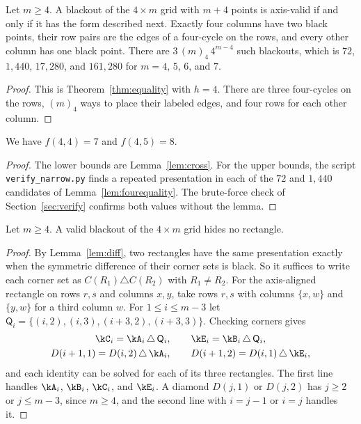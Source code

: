 \begin{lemma}\label{lem:fourequality}
Let $m\ge4$. A blackout of the $4\times m$ grid with $m+4$ points is axis-valid if and only if it has the form described next. Exactly four columns have two black points, their row pairs are the edges of a four-cycle on the rows, and every other column has one black point. There are $3\,(m)_4\,4^{m-4}$ such blackouts, which is $72$, $1{,}440$, $17{,}280$, and $161{,}280$ for $m=4$, $5$, $6$, and $7$.
\end{lemma}

\begin{proof}
This is Theorem~\ref{thm:equality} with $h=4$. There are three four-cycles on the rows, $(m)_4$ ways to place their labeled edges, and four rows for each other column.
\end{proof}

\begin{corollary}\label{cor:fourboundary}
We have $f(4,4)=7$ and $f(4,5)=8$.
\end{corollary}

\begin{proof}
The lower bounds are Lemma~\ref{lem:cross}. For the upper bounds, the script \texttt{verify\_narrow.py} finds a repeated presentation in each of the $72$ and $1{,}440$ candidates of Lemma~\ref{lem:fourequality}. The brute-force check of Section~\ref{sec:verify} confirms both values without the lemma.
\end{proof}

\begin{theorem}\label{thm:hidden}
Let $m\ge4$. A valid blackout of the $4\times m$ grid hides no rectangle.
\end{theorem}

\begin{proof}
By Lemma~\ref{lem:diff}, two rectangles have the same presentation exactly when the symmetric difference of their corner sets is black. So it suffices to write each corner set as $C(R_1)\triangle C(R_2)$ with $R_1\ne R_2$. For the axis-aligned rectangle on rows $r,s$ and columns $x,y$, take rows $r,s$ with columns $\{x,w\}$ and $\{y,w\}$ for a third column $w$. For $1\le i\le m-3$ let $\mathsf Q_i=\{(i,2),(i,3),(i+3,2),(i+3,3)\}$. Checking corners gives
\begin{equation}\label{eq:fourxor}
\begin{gathered}
\kC_i=\kA_i\,\triangle\,\mathsf Q_i,\qquad \kE_i=\kB_i\,\triangle\,\mathsf Q_i,\\
D(i+1,1)=D(i,2)\,\triangle\,\kA_i,\qquad D(i+1,2)=D(i,1)\,\triangle\,\kE_i,
\end{gathered}
\end{equation}
and each identity can be solved for each of its three rectangles. The first line handles $\kA_i$, $\kB_i$, $\kC_i$, and $\kE_i$. A diamond $D(j,1)$ or $D(j,2)$ has $j\ge2$ or $j\le m-3$, since $m\ge4$, and the second line with $i=j-1$ or $i=j$ handles it.
\end{proof}


